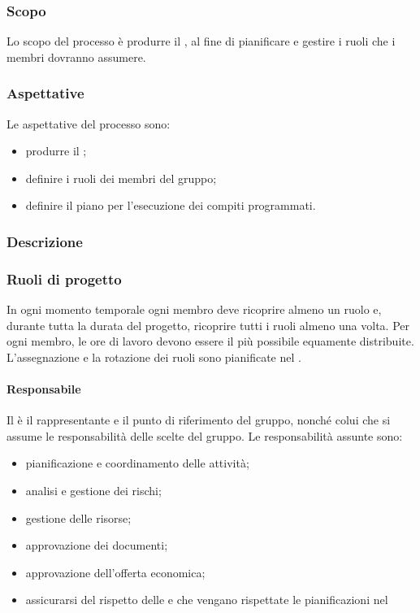 \subsubsection{Scopo}
Lo scopo del processo è produrre il \PPdoc , al fine di pianificare e gestire i ruoli che i membri dovranno assumere.
\subsubsection{Aspettative}
Le aspettative del processo sono:
 \begin{itemize}
  \item produrre il \PPdoc ;
  \item definire i ruoli dei membri del gruppo;
  \item definire il piano per l'esecuzione dei compiti programmati.
 \end{itemize}
\subsubsection{Descrizione}
 
\subsubsection{Ruoli di progetto}
 In ogni momento temporale ogni membro deve ricoprire almeno un ruolo e, durante tutta la durata del progetto, ricoprire tutti i ruoli almeno una volta. Per ogni membro, le ore di lavoro devono essere il più possibile equamente distribuite. L'assegnazione e la rotazione dei ruoli sono pianificate nel \PPdocRR.
 \paragraph{Responsabile}
 Il \RESP{} è il rappresentante e il punto di riferimento del gruppo, nonché colui che si assume le responsabilità delle scelte del gruppo.
 Le responsabilità assunte sono:
 \begin{itemize}
  \item pianificazione e coordinamento delle attività;
  \item analisi e gestione dei rischi;
  \item gestione delle risorse;
  \item approvazione dei documenti;
  \item approvazione dell'offerta economica;
  \item assicurarsi del rispetto delle \NPdoc{} e che vengano rispettate le pianificazioni nel \PPdoc
 \end{itemize}
